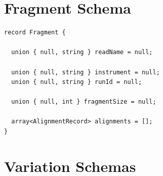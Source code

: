 \documentclass[phd]{ucbthesis}
\begin{document}
\section{Fragment Schema}
\label{sec:fragment}

\begin{lstlisting}[caption={ADAM} fragment schema]
record Fragment {

  union { null, string } readName = null;

  union { null, string } instrument = null;
  union { null, string } runId = null;

  union { null, int } fragmentSize = null;

  array<AlignmentRecord> alignments = [];
}
\end{lstlisting}

\section{Variation Schemas}
\label{sec:variation-schemas}
\end{document}
